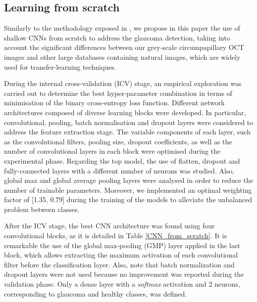 \subsection{Learning from scratch} \label{subsec: From_scratch}

Similarly to the methodology exposed in \cite{gomez2019automatic}, we propose in this paper the use of shallow CNNs from scratch to address the glaucoma detection, taking into account the significant differences between our grey-scale circumpapillary OCT images and other large databases containing natural images, which are widely used for transfer-learning techniques.

During the internal cross-validation (ICV) stage, an empirical exploration was carried out to determine the best hyper-parameter combination in terms of minimisation of the binary cross-entropy loss function. Different network architectures composed of diverse learning blocks were developed. In particular, convolutional, pooling, batch normalisation and dropout layers were considered to address the feature extraction stage. The variable components of each layer, such as the convolutional filters, pooling size, dropout coefficients, as well as the number of convolutional layers in each block were optimised during the experimental phase.  
Regarding the top model, the use of flatten, dropout and fully-connected layers with a different number of neurons was studied. Also, global max and global average pooling layers were analysed in order to reduce the number of trainable parameters.
Moreover, we implemented an optimal weighting factor of [1.35, 0.79] during the training of the models to alleviate the unbalanced problem between classes. 

After the ICV stage, the best CNN architecture was found using four convolutional blocks, as it is detailed in Table \ref{CNN_from_scratch}. It is remarkable the use of the global max-pooling (GMP) layer applied in the last block, which allows extracting the maximum activation of each convolutional filter before the classification layer. Also, note that batch normalization and dropout layers were not used because no improvement was reported during the validation phase. Only a dense layer with a \textit{softmax} activation and 2 neurons, corresponding to glaucoma and healthy classes, was defined. 

